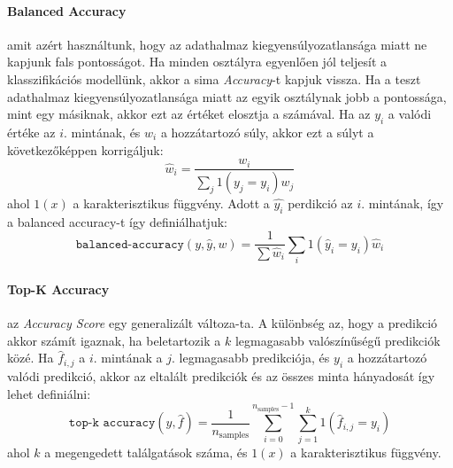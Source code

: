 \documentclass[acmtog, authorversion]{acmart}
\begin{document}
\paragraph{Balanced Accuracy}
amit azért használtunk, hogy az adathalmaz kiegyensúlyozatlansága miatt ne kapjunk fals pontosságot. Ha minden osztályra egyenlően jól teljesít a klasszifikációs modellünk, akkor a sima \emph{Accuracy}-t kapjuk vissza.
Ha a teszt adathalmaz kiegyensúlyozatlansága miatt az egyik osztálynak jobb a pontossága, mint egy másiknak, akkor ezt az értéket elosztja a számával. Ha az \begin{math}y_i\end{math} a valódi értéke az \begin{math}i\end{math}. mintának, és \begin{math}w_i\end{math} a hozzátartozó súly, akkor ezt a súlyt a következőképpen korrigáljuk:
\begin{equation}
    \hat{w}_i = \frac{w_i}{\sum_j{1(y_j = y_i) w_j}}
\end{equation}
ahol \begin{math}1(x)\end{math} a karakterisztikus függvény. Adott a \begin{math}\hat{y_i}\end{math} perdikció az \begin{math}i\end{math}.
mintának, így a balanced accuracy-t így definiálhatjuk:
\begin{equation}
    \texttt{balanced-accuracy}(y, \hat{y}, w) = \frac{1}{\sum{\hat{w}_i}} \sum_i 1(\hat{y}_i = y_i) \hat{w}_i
\end{equation}
\paragraph{Top-K Accuracy}
az \emph{Accuracy Score} egy generalizált változa-ta. A különbség az, hogy a predikció akkor számít igaznak, ha beletartozik a \begin{math}k\end{math}
legmagasabb valószínűségű predikciók közé. Ha \begin{math}\hat{f}_{i,j}\end{math} a \begin{math}i\end{math}. mintának a \begin{math}j\end{math}. legmagasabb 
predikciója, és \begin{math}y_i\end{math} a hozzátartozó valódi predikció, akkor az eltalált predikciók és az összes minta hányadosát így
lehet definiálni:
\begin{equation}
    \texttt{top-k accuracy}(y, \hat{f}) = \frac{1}{n_\text{samples}} \sum_{i=0}^{n_\text{samples}-1} \sum_{j=1}^{k} 1(\hat{f}_{i,j} = y_i)
\end{equation}
ahol \begin{math}k\end{math} a megengedett találgatások száma, és \begin{math}1(x)\end{math} a karakterisztikus függvény.
\end{document}
